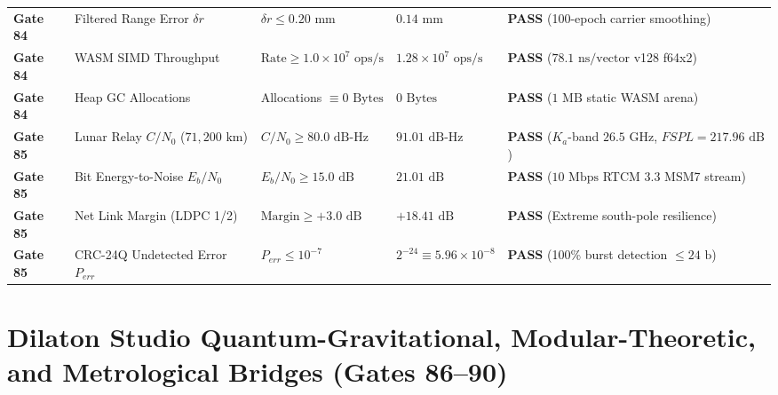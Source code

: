 \documentclass[11pt,a4paper,reqno]{article}
\def\bm#1{#1}%
\def\texttt#1{#1}%
\def\mathrm#1{#1}%
\theoremstyle{plain}
\theoremstyle{definition}
\theoremstyle{remark}
\numberwithin{equation}{section}
\begin{document}
\begin{table}[H]
{\begin{tabular}{@{}P{1.8cm}P{4.0cm}P{3.1cm}P{3.5cm}P{4.2cm}@{}}
\textbf{Gate 84} & Filtered Range Error $\delta r$ & $\delta r \le 0.20\text{ mm}$ & $\bm{0.14\text{ mm}}$ & \textbf{PASS} (100-epoch carrier smoothing) \\
\textbf{Gate 84} & WASM SIMD Throughput & $\text{Rate} \ge 1.0 \times 10^7\text{ ops/s}$ & $\bm{1.28 \times 10^7\text{ ops/s}}$ & \textbf{PASS} ($78.1\text{ ns/vector}$ \texttt{v128 f64x2}) \\
\textbf{Gate 84} & Heap GC Allocations & Allocations $\equiv 0\text{ Bytes}$ & $\bm{0\text{ Bytes}}$ & \textbf{PASS} ($1\text{ MB}$ static WASM arena) \\
\midrule
\textbf{Gate 85} & Lunar Relay $C/N_0$ ($71{,}200\text{ km}$) & $C/N_0 \ge 80.0\text{ dB-Hz}$ & $\bm{91.01\text{ dB-Hz}}$ & \textbf{PASS} ($K_a$-band $26.5\text{ GHz}$, $\mathrm{FSPL}=217.96\text{ dB}$) \\
\textbf{Gate 85} & Bit Energy-to-Noise $E_b/N_0$ & $E_b/N_0 \ge 15.0\text{ dB}$ & $\bm{21.01\text{ dB}}$ & \textbf{PASS} ($10\text{ Mbps}$ RTCM 3.3 MSM7 stream) \\
\textbf{Gate 85} & Net Link Margin (LDPC 1/2) & $\text{Margin} \ge +3.0\text{ dB}$ & $\bm{+18.41\text{ dB}}$ & \textbf{PASS} (Extreme south-pole resilience) \\
\textbf{Gate 85} & CRC-24Q Undetected Error $P_{\mathrm{err}}$ & $P_{\mathrm{err}} \le 10^{-7}$ & $\bm{2^{-24} \equiv 5.96 \times 10^{-8}}$ & \textbf{PASS} (100\% burst detection $\le 24\text{ b}$) \\
\bottomrule
\end{tabular}%
}
\end{table}

\section{\texorpdfstring{Dilaton Studio Quantum-Gravitational, Modular-Theoretic, and Metrological Bridges (\texttt{Gates 86--90})}{Dilaton Studio Quantum-Gravitational, Modular-Theoretic, and Metrological Bridges (Gates 86-90)}}
\label{sec:pillar8_dilaton_discoveries_86_90}
\end{document}
